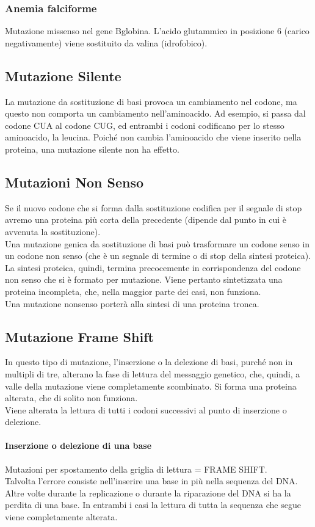 \documentclass{article}
\begin{document}
\subsubsection{Anemia falciforme}Mutazione missenso nel gene Bglobina. L'acido
glutammico in posizione 6 (carico negativamente) viene sostituito da valina (idrofobico).
\subsection{Mutazione Silente}
La mutazione da sostituzione di basi provoca un cambiamento nel codone, ma questo non
comporta un cambiamento nell'aminoacido. Ad esempio, si passa dal codone CUA al
codone CUG, ed entrambi i codoni codificano per lo stesso aminoacido, la leucina. Poiché non
cambia l'aminoacido che viene inserito nella proteina, una mutazione silente non ha effetto.
\subsection{Mutazioni Non Senso}
Se il nuovo codone che si forma dalla sostituzione codifica per il segnale di stop avremo una proteina più corta della precedente (dipende dal punto in cui è avvenuta la sostituzione).\\
Una mutazione genica da sostituzione di basi può trasformare un codone senso in un codone non senso (che è un segnale di termine o di stop
della sintesi proteica). La sintesi proteica, quindi, termina precocemente in corrispondenza del codone non senso che si è
formato per mutazione. Viene pertanto sintetizzata una proteina incompleta, che, nella maggior parte dei casi, non funziona.\\
Una mutazione nonsenso porterà alla sintesi di una proteina tronca.

\subsection{Mutazione Frame Shift}
In questo tipo di mutazione, l'inserzione o la delezione di basi, purché non in multipli di tre, alterano la fase di lettura del messaggio genetico, che, quindi, a valle della mutazione viene completamente scombinato. 
Si forma una proteina alterata, che di solito non funziona.\\
Viene alterata la lettura di tutti i codoni successivi al punto di inserzione o delezione.
\paragraph{Inserzione o delezione di una base}
Mutazioni per spostamento della griglia di lettura = FRAME SHIFT.\\
Talvolta l'errore consiste nell'inserire una base in più nella sequenza del DNA. Altre volte durante la replicazione o durante la riparazione del DNA si ha la perdita di una base.
In entrambi i casi la lettura di tutta la sequenza che segue viene completamente alterata.
\end{document}
